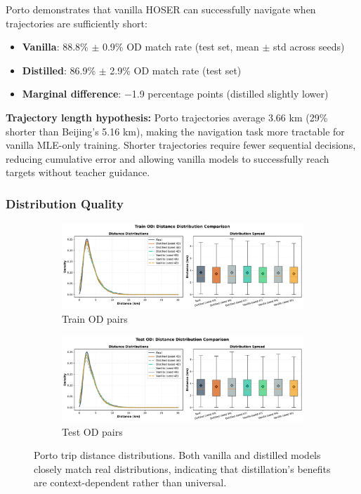 Porto demonstrates that vanilla HOSER can successfully navigate when trajectories are sufficiently short:
\begin{itemize}[leftmargin=*,noitemsep]
    \item \textbf{Vanilla}: 88.8\% $\pm$ 0.9\% OD match rate (test set, mean $\pm$ std across seeds)
    \item \textbf{Distilled}: 86.9\% $\pm$ 2.9\% OD match rate (test set)
    \item \textbf{Marginal difference}: $-$1.9 percentage points (distilled slightly lower)
\end{itemize}

\textbf{Trajectory length hypothesis:} Porto trajectories average 3.66 km (29\% shorter than Beijing's 5.16 km), making the navigation task more tractable for vanilla MLE-only training. Shorter trajectories require fewer sequential decisions, reducing cumulative error and allowing vanilla models to successfully reach targets without teacher guidance.

\subsubsection{Distribution Quality}

\begin{figure}[t]
    \centering
    \begin{subfigure}{0.49\linewidth}
        \centering
        \includegraphics[width=\linewidth]{assets/plots/eval/porto/distributions/distance_distribution_train_od.pdf}
        \caption{Train OD pairs}
    \end{subfigure}
    \begin{subfigure}{0.49\linewidth}
        \centering
        \includegraphics[width=\linewidth]{assets/plots/eval/porto/distributions/distance_distribution_test_od.pdf}
        \caption{Test OD pairs}
    \end{subfigure}
    \caption{Porto trip distance distributions. Both vanilla and distilled models closely match real distributions, indicating that distillation's benefits are context-dependent rather than universal.}
    \label{fig:porto-distance-distributions}
\end{figure}

